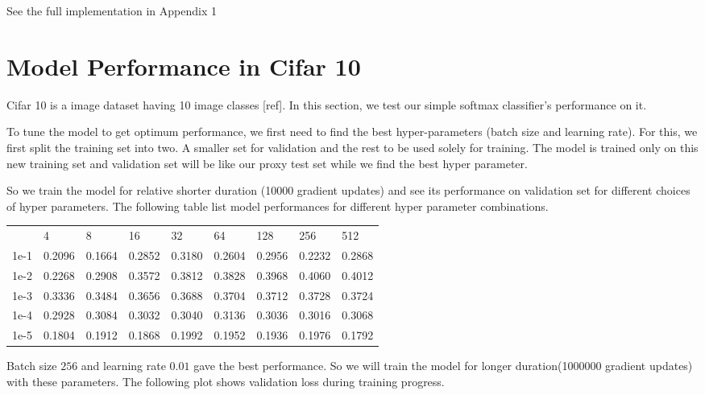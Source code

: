 \documentclass[10pt]{article}
\begin{document}
See the full implementation in Appendix 1

\section{Model Performance in Cifar 10}
Cifar 10 is a image dataset having 10 image classes [ref]. In this section, we test our simple softmax classifier's performance on it. 

To tune the model to get optimum performance, we first need to find the best hyper-parameters (batch size and learning rate). For this, we first split the training set into two. A smaller set for validation and the rest to be used solely for training. The model is trained only on this new training set and validation set will be like our proxy test set while we find the best hyper parameter. 

So we train the model for relative shorter duration (10000 gradient updates) and see its performance on validation set for different choices of hyper parameters. The following table list model performances for different hyper parameter combinations.

\begin{table}
\begin{tabular}{lllllllll}
      &    4   &    8  &   16  &   32  &   64  &   128 &    256 &    512\\
1e-1  & 0.2096 & 0.1664& 0.2852& 0.3180& 0.2604& 0.2956& 0.2232 & 0.2868\\
1e-2  & 0.2268 & 0.2908& 0.3572& 0.3812& 0.3828& 0.3968& 0.4060 & 0.4012\\
1e-3  & 0.3336 & 0.3484& 0.3656& 0.3688& 0.3704& 0.3712& 0.3728 & 0.3724\\
1e-4  & 0.2928 & 0.3084& 0.3032& 0.3040& 0.3136& 0.3036& 0.3016 & 0.3068\\
1e-5  & 0.1804 & 0.1912& 0.1868& 0.1992& 0.1952& 0.1936& 0.1976 & 0.1792
\end{tabular}
\end{table}
Batch size $256$ and learning rate $0.01$ gave the best performance. So we will train the model for longer duration(1000000 gradient updates) with these parameters. The following plot shows validation loss during training progress.
\end{document}
